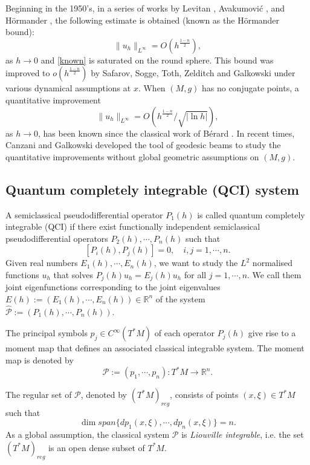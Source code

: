 \documentclass[12pt,reqno]{amsart}
\newcommand{\R}{{\mathbb R}}
\numberwithin{equation}{section}
\begin{document}
Beginning in the 1950's, in a series of works by Levitan \cite{Lev}, Avakumovi\'c \cite{Ava}, and H\"ormander \cite{Hor}, the following estimate is obtained (known as the H\"ormander bound):
\begin{equation}\label{known}
\|u_h\|_{L^\infty}=O(h^{\frac{1-n}2}),
\end{equation}
as $h\to 0$ and \eqref{known} is saturated on the round sphere. This bound was improved to $o(h^{\frac{1-n}2})$ by Safarov, Sogge, Toth, Zelditch and Galkowski \cite{Saf88, SZ02, STZ11, SZ16a, SZ16b, GT17, Gal19} under various dynamical assumptions at $x$. When $(M,g)$ has no conjugate points, a quantitative improvement
\begin{equation}\label{know1}
\|u_h\|_{L^\infty}=O(h^{\frac{1-n}2}/\sqrt{|\ln h|}),
\end{equation}
as $h\to 0$, has been known since the classical work of B\'erard \cite{Ber77, Bon17, Ran78}. In recent times, Canzani and Galkowski \cite{CG21, CG23} developed the tool of geodesic beams to study the quantitative improvements without global geometric assumptions on $(M,g)$. 

\subsection{Quantum completely integrable (QCI) system}
A semiclassical pseudodifferential operator $P_1(h)$ is called quantum completely integrable (QCI) if there exist functionally independent semiclassical pseudodifferential operators $P_2(h),\cdots,P_n(h)$ such that 
$$
[P_i(h),P_j(h)]=0,\quad i,j=1,\cdots, n.
$$
Given real numbers $E_1(h),\cdots, E_n(h)$, we want to study the $L^2$ normalised functions $u_h$ that solves $P_j(h)u_h=E_j(h)u_h$ for all $j=1,\cdots,n$. We call them joint eigenfunctions corresponding to the joint eigenvalues $E(h):=(E_1(h),\cdots,E_n(h))\in \R^n$ of the system $\hat{\mathcal{P}}:=(P_1(h),\cdots, P_n(h))$.

The principal symbols $p_j\in C^{\infty}(T^*M)$ of each operator $P_j(h)$ give rise to a moment map that defines an associated classical integrable system. The moment map is denoted by
$$
\mathcal{P}:=(p_1,\cdots,p_n):T^*M\to \R^n.
$$

The regular set of $\mathcal{P}$, denoted by $(T^*M)_{reg}$, consists of points $(x,\xi)\in T^*M$ such that
$$
\dim span\{ dp_1(x,\xi),\cdots,dp_n(x,\xi)\}=n.
$$
As a global assumption, the classical system $\mathcal{P}$ is {\textit{Liouville integrable}}, i.e. the set $(T^*M)_{reg}$ is an open dense subset of $T^*M$.
\end{document}
